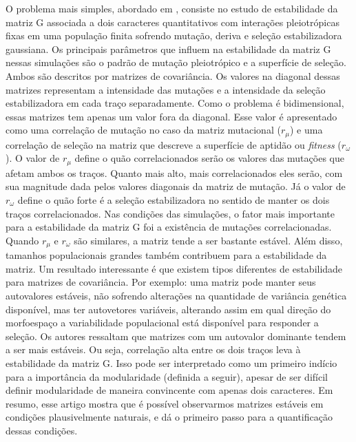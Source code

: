 O problema mais simples, abordado em \cite{Jones2003}, consiste no
estudo de estabilidade da matriz G associada a dois caracteres
quantitativos com interações pleiotrópicas fixas em uma população finita
sofrendo mutação, deriva e seleção estabilizadora gaussiana. 
Os principais parâmetros que influem na estabilidade da matriz G nessas
simulações são o padrão de mutação pleiotrópico e a superfície de
seleção. 
Ambos são descritos por matrizes de covariância. 
Os valores na diagonal dessas matrizes representam a intensidade das
mutações e a intensidade da seleção estabilizadora em cada traço
separadamente. 
Como o problema é bidimensional, essas matrizes tem apenas um valor fora
da diagonal. 
Esse valor é apresentado como uma correlação de mutação no caso da
matriz mutacional ($r_\mu$) e uma correlação de seleção na matriz que
descreve a superfície de aptidão ou {\it fitness} ($r_\omega$). 
O valor de $r_\mu$ define o quão correlacionados serão os valores das
mutações que afetam ambos os traços. 
Quanto mais alto, mais correlacionados eles serão, com sua magnitude
dada pelos valores diagonais da matriz de mutação. 
Já o valor de $r_\omega$ define o quão forte é a seleção estabilizadora
no sentido de manter os dois traços correlacionados. 
Nas condições das simulações, o fator mais importante para a
estabilidade da matriz G foi a existência de mutações correlacionadas. 
Quando $r_\mu$ e $r_\omega$ são similares, a matriz tende a ser bastante
estável. 
Além disso, tamanhos populacionais grandes também contribuem para a
estabilidade da matriz. 
Um resultado interessante é que existem tipos diferentes de estabilidade
para matrizes de covariância. 
Por exemplo: uma matriz pode manter seus autovalores estáveis, não
sofrendo alterações na quantidade de variância genética disponível, mas
ter autovetores variáveis, alterando assim em qual direção do
morfoespaço a variabilidade populacional está disponível para responder
a seleção. 
Os autores ressaltam que matrizes com um autovalor dominante tendem a
ser mais estáveis. 
Ou seja, correlação alta entre os dois traços leva à estabilidade da
matriz G. 
Isso pode ser interpretado como um primeiro indício para a importância
da modularidade (definida a seguir), apesar de ser difícil definir
modularidade de maneira convincente com apenas dois caracteres. 
Em resumo, esse artigo mostra que é possível observarmos matrizes
estáveis em condições plausivelmente naturais, e dá o primeiro passo
para a quantificação dessas condições. 

